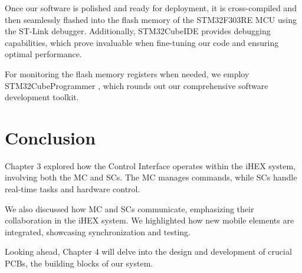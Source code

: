 Once our software is polished and ready for deployment, it is cross-compiled and then seamlessly flashed into the flash memory of the STM32F303RE MCU using the ST-Link debugger. Additionally, STM32CubeIDE provides debugging capabilities, which prove invaluable when fine-tuning our code and ensuring optimal performance. 

For monitoring the flash memory registers when needed, we employ STM32CubeProgrammer \cite{R18}, which rounds out our comprehensive software development toolkit.


\section*{Conclusion}
Chapter 3 explored how the Control Interface operates within the iHEX system, involving both the MC and SCs. The MC manages commands, while SCs handle real-time tasks and hardware control.

We also discussed how MC and SCs communicate, emphasizing their collaboration in the iHEX system. We highlighted how new mobile elements are integrated, showcasing synchronization and testing.

Looking ahead, Chapter 4 will delve into the design and development of crucial PCBs, the building blocks of our system.